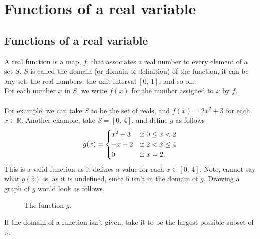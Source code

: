 \documentclass[10pt, a4paper]{article}
\newcommand{\R}{\mathbb{R}}
\begin{document}
\newpage

\section{Functions of a real variable}

\subsection{Functions of a real variable}
A real function is a map, $f$, that associates a real number to every element of a set $S$. $S$ is called the domain (or domain of definition) of the function, it can be any set: the real numbers, the unit interval $[0,\,1]$, and so on. \\
For each number $x$ in $S$, we write $f(x)$ for the number assigned to $x$ by $f$. \\
\\
For example, we can take $S$ to be the set of reals, and $f(x) = 2x ^ 2 + 3$ for each $x \in \R$. Another example, take $S = [0,\,4]$, and define $g$ as follows
\[
g(x) =
\begin{cases}
    x ^ 2 + 3 &\textnormal{if } 0 \leq x < 2 \\
    -x - 2 &\textnormal{if } 2 < x \leq 4 \\
    0 &\textnormal{if } x = 2.
\end{cases}
\]
This is a valid function as it defines a value for each $x \in [0,\,4]$. Note, cannot say what $g(5)$ is, as it is undefined, since $5$ isn't in the domain of $g$.  Drawing a graph of $g$ would look as follows,
\begin{figure}[ht]
    \centering
    \caption{The function $g$.}
    \label{fig:func1}
\end{figure}
If the domain of a function isn't given, take it to be the largest possible subset of $\R$. \\
\end{document}
